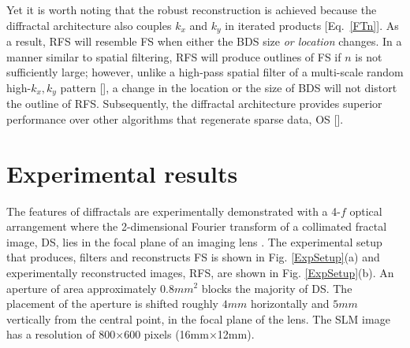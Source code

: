 Yet it is worth noting that the robust reconstruction is achieved because the diffractal architecture also couples $k_x$ and $k_y$ in iterated products [Eq.~\ref{FTn}].  As a result, RFS will resemble FS when either the BDS size {\it or location} changes.  In a manner similar to spatial filtering, RFS will produce outlines of FS if $n$ is not sufficiently large; however, unlike a high-pass spatial filter of a multi-scale random high-$k_x,k_y$ pattern [\cite{Kelly07}], a change in the location or the size of BDS will not distort the outline of RFS.  Subsequently, the diffractal architecture provides superior performance over other algorithms that regenerate sparse data, OS [\cite{Kelly07, Howland}].   



\section{Experimental results} \label{experiment}
\indent The features of diffractals are experimentally demonstrated with a 4-$f$ optical arrangement where the 2-dimensional Fourier transform of a collimated fractal image, DS, lies in the focal plane of an imaging lens \cite{Goodman}.  The experimental setup that produces, filters and reconstructs FS is shown in Fig. \ref{ExpSetup}(a) and experimentally reconstructed images, RFS, are shown in Fig. \ref{ExpSetup}(b). An aperture of area approximately $0.8mm^2$ blocks the majority of DS. The placement of the aperture is shifted roughly $4mm$ horizontally and $5mm$ vertically from the central point, in the focal plane of the lens. The SLM image has a resolution of 800$\times$600 pixels (16mm$\times$12mm).  

